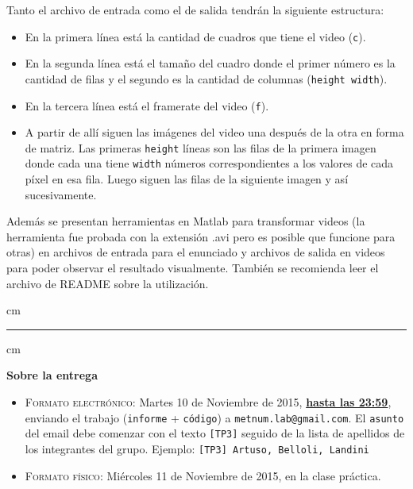     Tanto el archivo de entrada como el de salida tendrán la siguiente estructura:

    \begin{itemize}
      \item En la primera línea está la cantidad de cuadros que tiene el video (\verb|c|).
      \item En la segunda línea está el tamaño del cuadro donde el primer número es la cantidad de filas y el segundo es la cantidad de columnas (\verb|height width|).
      \item En la tercera línea está el framerate del video (\verb|f|).
      \item A partir de allí siguen las imágenes del video una después de la otra en forma de matriz. Las primeras \verb|height| l\'ineas son las filas de la primera imagen donde cada una tiene \verb|width| n\'umeros correspondientes a los valores de cada píxel en esa fila. Luego siguen las filas de la siguiente imagen y as\'i sucesivamente.
    \end{itemize}

    Además se presentan herramientas en Matlab para transformar videos (la herramienta fue probada con la extensión .avi pero es posible que funcione para otras) en archivos de entrada para el enunciado y archivos de salida en videos para poder observar el resultado visualmente. También se recomienda leer el archivo de README sobre la utilización.


     cm
    \hrule
     cm

    {\bf Sobre la entrega}
    \begin{itemize}
    \item \textsc{Formato electr\'onico:} Martes 10 de Noviembre de 2015, {\bf{\underline{hasta las 23:59}}}, enviando el trabajo
    (\texttt{informe} + \texttt{c\'odigo}) a \texttt{metnum.lab@gmail.com}. El \texttt{asunto} del email debe comenzar con el texto \verb|[TP3]| seguido
    de la lista de apellidos de los integrantes del grupo. Ejemplo: \texttt{[TP3] Artuso, Belloli, Landini}
    \item \textsc{Formato f\'isico:} Mi\'ercoles 11 de Noviembre de 2015, en la clase pr\'actica.
    \end{itemize}